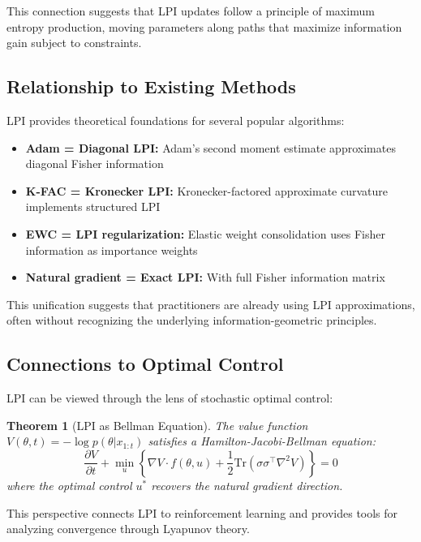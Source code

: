 \documentclass[11pt]{article}
\newtheorem{theorem}{Theorem}
\begin{document}
This connection suggests that LPI updates follow a principle of maximum entropy production, moving parameters along paths that maximize information gain subject to constraints.

\subsection{Relationship to Existing Methods}

LPI provides theoretical foundations for several popular algorithms:

\begin{itemize}
\item \textbf{Adam = Diagonal LPI:} Adam's second moment estimate approximates diagonal Fisher information
\item \textbf{K-FAC = Kronecker LPI:} Kronecker-factored approximate curvature implements structured LPI
\item \textbf{EWC = LPI regularization:} Elastic weight consolidation uses Fisher information as importance weights
\item \textbf{Natural gradient = Exact LPI:} With full Fisher information matrix
\end{itemize}

This unification suggests that practitioners are already using LPI approximations, often without recognizing the underlying information-geometric principles.

\subsection{Connections to Optimal Control}

LPI can be viewed through the lens of stochastic optimal control:

\begin{theorem}[LPI as Bellman Equation]
The value function $V(\theta, t) = -\log p(\theta|x_{1:t})$ satisfies a Hamilton-Jacobi-Bellman equation:
\begin{equation}
\frac{\partial V}{\partial t} + \min_u \left\{\nabla V \cdot f(\theta, u) + \frac{1}{2}\text{Tr}(\sigma\sigma^\top \nabla^2 V)\right\} = 0
\end{equation}
where the optimal control $u^*$ recovers the natural gradient direction.
\end{theorem}

This perspective connects LPI to reinforcement learning and provides tools for analyzing convergence through Lyapunov theory.
\end{document}
